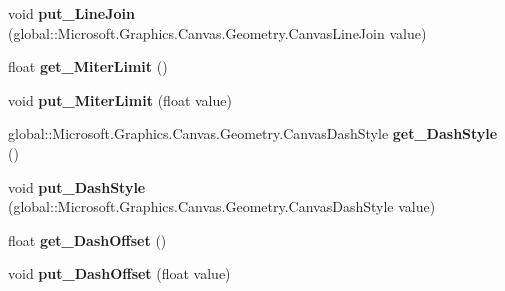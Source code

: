 \begin{DoxyCompactItemize}
void {\bfseries put\+\_\+\+Line\+Join} (global\+::\+Microsoft.\+Graphics.\+Canvas.\+Geometry.\+Canvas\+Line\+Join value)
\item 
\mbox{\label{class_microsoft_1_1_graphics_1_1_canvas_1_1_geometry_1_1_canvas_stroke_style_a999cba5c52b4a29dc17175ce7f226aec}} 
float {\bfseries get\+\_\+\+Miter\+Limit} ()
\item 
\mbox{\label{class_microsoft_1_1_graphics_1_1_canvas_1_1_geometry_1_1_canvas_stroke_style_ad0733f31456bf9ae960760a481eb54a5}} 
void {\bfseries put\+\_\+\+Miter\+Limit} (float value)
\item 
\mbox{\label{class_microsoft_1_1_graphics_1_1_canvas_1_1_geometry_1_1_canvas_stroke_style_ab7a77fa7925c62bfceb8ec4a9ffed0a2}} 
global\+::\+Microsoft.\+Graphics.\+Canvas.\+Geometry.\+Canvas\+Dash\+Style {\bfseries get\+\_\+\+Dash\+Style} ()
\item 
\mbox{\label{class_microsoft_1_1_graphics_1_1_canvas_1_1_geometry_1_1_canvas_stroke_style_a58b2ea381cdec6b425c64655ffe06924}} 
void {\bfseries put\+\_\+\+Dash\+Style} (global\+::\+Microsoft.\+Graphics.\+Canvas.\+Geometry.\+Canvas\+Dash\+Style value)
\item 
\mbox{\label{class_microsoft_1_1_graphics_1_1_canvas_1_1_geometry_1_1_canvas_stroke_style_ad6a5cdd86562a8dfdb8e856ccf7227dc}} 
float {\bfseries get\+\_\+\+Dash\+Offset} ()
\item 
\mbox{\label{class_microsoft_1_1_graphics_1_1_canvas_1_1_geometry_1_1_canvas_stroke_style_a01c2250f29f3c8b71ac14ac77e246dff}} 
void {\bfseries put\+\_\+\+Dash\+Offset} (float value)
\item 
\mbox{\label{class_microsoft_1_1_graphics_1_1_canvas_1_1_geometry_1_1_canvas_stroke_style_aed5aa05f608f3835623113c1f789483d}} 

\end{DoxyCompactItemize}
